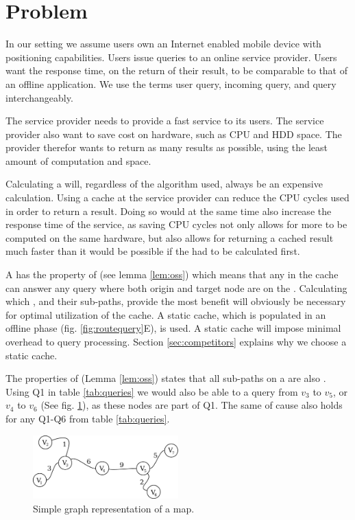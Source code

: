 \section{Problem}\label{sec:problem}

In our setting we assume users own an Internet enabled mobile device with positioning capabilities. Users issue \spath queries to an online service provider. Users want the response time, on the return of their \spath result, to be comparable to that of an offline application. We use the terms user query, incoming query, and query interchangeably.

The \spath service provider needs to provide a fast service to its users. The service provider also want to save cost on hardware, such as CPU and HDD space. The \spath provider therefor wants to return as many \spath results as possible, using the least amount of computation and space.

Calculating a \spath will, regardless of the algorithm used, always be an expensive calculation\cite{CNeed}. Using a \spath cache at the \spath service provider can reduce the CPU cycles used in order to return a \spath result. Doing so would at the same time also increase the response time of the \spath service, as saving CPU cycles not only allows for more \spaths to be computed on the same hardware, but also allows for returning a cached result much faster than it would be possible if the \spath had to be calculated first.

A \spath has the property of \oss (see lemma \ref{lem:oss}) which means that any \spath in the cache can answer any \spath query where both origin and target node are on the \spathns. Calculating which \spathsns, and their sub-paths, provide the most benefit will obviously be necessary for optimal utilization of the cache. A static cache, which is populated in an offline phase (fig. \ref{fig:routequery}E), is used. A static cache will impose minimal overhead to query processing. Section \ref{sec:competitors} explains why we choose a static cache.

The properties of \ossns (Lemma \ref{lem:oss}) states that all sub-paths on a \spath are also \spathsns. Using \spath Q1 in table \ref{tab:queries} we would also be able to a query from $v_3$ to $v_5$, or $v_4$ to $v_6$ (See fig. \ref{fig:rxmap}), as these nodes are part of Q1. The same of cause also holds for any \spath Q1-Q6 from table \ref{tab:queries}.

\begin{figure}[hbt]
  \center
        \includegraphics[width=0.5\textwidth]{figures/rxmap}
        \caption{Simple graph representation of a map.}
  \label{fig:rxmap}
\end{figure}


